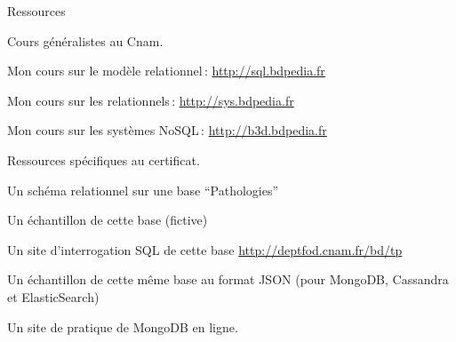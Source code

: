 \begin{frame}[fragile]{Ressources}

Cours généralistes au Cnam.

\begin{redbullet}
  \item Mon cours sur le modèle relationnel\,: \url{http://sql.bdpedia.fr}
  \item Mon cours sur les relationnels\,: \url{http://sys.bdpedia.fr}
  \item Mon cours sur les systèmes NoSQL\,: \url{http://b3d.bdpedia.fr}
 \end{redbullet}

\vfill

Ressources spécifiques au certificat.


\begin{redbullet}
  \item Un schéma relationnel sur une base ``Pathologies''
  \item Un échantillon de cette base (fictive)
  \item Un site d'interrogation SQL de cette base \url{http://deptfod.cnam.fr/bd/tp}
  \item Un échantillon de cette même base au format JSON (pour MongoDB, Cassandra et ElasticSearch)
  \item Un site de pratique de MongoDB en ligne.
 \end{redbullet}

\end{frame}



